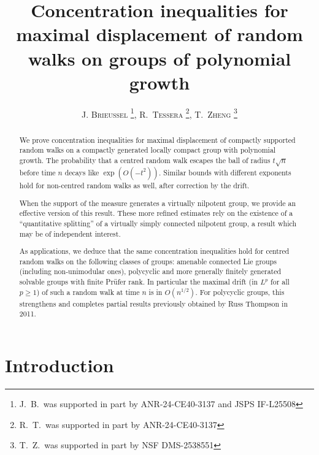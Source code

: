 \documentclass[11pt,leqno]{article}
\theoremstyle{plain}
\theoremstyle{definition}
\theoremstyle{remark}
\numberwithin{equation}{section}
\begin{document}
   

\title{Concentration inequalities for maximal displacement of random walks on groups of polynomial growth}
\date{}


\author{\scshape 
J. Brieussel%
\footnote{J.~B.~was supported in part by ANR-24-CE40-3137 and JSPS IF-L25508}, 
R.~Tessera%
\footnote{R.~T.~was supported in part by ANR-24-CE40-3137},%
T.~Zheng%
\footnote{T.~Z.~was supported in part by NSF DMS-2538551}%
}
%
\AtEndDocument{\bigskip{\footnotesize%
 \par
\addvspace{\medskipamount}
}}



\maketitle

\begin{abstract}
We prove concentration inequalities for maximal displacement of
compactly supported random walks on a compactly generated locally
compact group with polynomial growth. The probability that a centred random
walk escapes the ball of radius $t\sqrt{n}$ before time $n$ decays
like $\exp(O(-t^{2}))$. Similar bounds with different exponents hold for non-centred random walks as well, after correction by the drift. 

When the support of the measure generates a virtually nilpotent group, we provide an effective version of this result. These more refined estimates rely on the existence of a ``quantitative splitting'' of a virtually simply connected nilpotent group, a result which may be of independent interest. 

As applications, we deduce that the same
concentration inequalities hold for centred random walks on the following classes of groups: amenable connected
Lie groups (including non-unimodular ones), polycyclic and more generally
finitely generated solvable groups with finite Pr\"ufer rank. In
particular the maximal drift (in $L^{p}$ for all $p\geq1$) of such
a random walk at time $n$ is in $O(n^{1/2})$. For polycyclic groups, this strengthens and completes partial results previously obtained by Russ Thompson in
2011. 
\end{abstract}

\section{Introduction}
\end{document}
